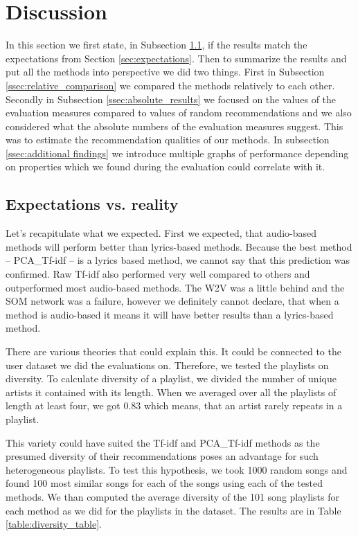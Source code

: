 \section{Discussion}\label{sec:discussion}
In this section we first state, in Subsection \ref{ssec:exp_vs_reality}, 
if the results match the expectations from Section \ref{sec:expectations}. Then to summarize the results and put all the 
methods into perspective we did two things. First in Subsection 
\ref{ssec:relative_comparison} we compared the methods relatively to each 
other. Secondly in Subsection \ref{ssec:absolute_results} we focused on the 
values of the evaluation measures compared to values of random recommendations and we also considered what the absolute numbers of the evaluation measures suggest. This was to estimate the recommendation qualities of our methods. In subsection \ref{ssec:additional findings} we introduce multiple graphs of performance depending on properties which we found during the evaluation could correlate with it. 

\subsection{Expectations vs. reality}\label{ssec:exp_vs_reality}
Let's recapitulate what we expected. First we expected, that audio-based methods will perform better than lyrics-based methods. Because the best
method -- PCA\_Tf-idf -- is a lyrics based method, we cannot say that this 
prediction was confirmed. Raw Tf-idf also performed very well compared to 
others and outperformed most audio-based methods.  The W2V was a little 
behind and the SOM network was a failure, however we definitely cannot declare,
that when a method is audio-based it means it will have better results than a lyrics-based method.

There are various theories that could explain this. It could be connected to the user dataset we did the evaluations on. Therefore, we tested the playlists on 
diversity. To calculate diversity of a playlist, we divided the number of unique artists it contained with its length. When we averaged over all the playlists of length at least four, we got 0.83 which means, that an 
artist rarely repeats in a playlist. 

This variety could have suited the 
Tf-idf and PCA\_Tf-idf methods as the presumed diversity of their recommendations poses 
an advantage for such heterogeneous playlists. To test this hypothesis, we 
took 1000 random songs and found 100 most similar songs for each of the songs using each of the tested methods. We than computed the average diversity of the 101 song playlists for each method as we did for the playlists in the dataset. The results are in Table \ref{table:diversity_table}.

